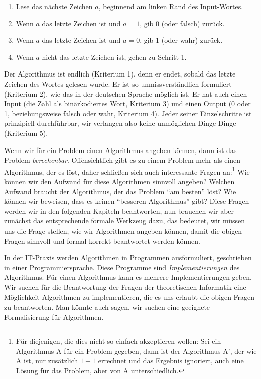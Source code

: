 \begin{enumerate}
    \item Lese das nächste Zeichen $a$, beginnend am linken Rand des Input-Wortes.
    \item Wenn $a$ das letzte Zeichen ist und $a = 1$, gib 0 (oder falsch) zurück.
    \item Wenn $a$ das letzte Zeichen ist und $a = 0$, gib 1 (oder wahr) zurück.
    \item Wenn $a$ nicht das letzte Zeichen ist, gehen zu Schritt 1.
\end{enumerate}

Der Algorithmus ist endlich (Kriterium 1),
denn er endet,
sobald das letzte Zeichen des Wortes gelesen wurde.
Er ist so unmissverständlich formuliert (Kriterium 2),
wie das in der deutschen Sprache möglich ist.
Er hat auch einen Input (die Zahl als binärkodiertes Wort, Kriterium 3)
und einen Output (0 oder 1, beziehungsweise falsch oder wahr, Kriterium 4).
Jeder seiner Einzelschritte ist prinzipiell durchführbar,
wir verlangen also keine unmöglichen Dinge Dinge (Kriterium 5).

Wenn wir für ein Problem einen Algorithmus angeben können,
dann ist das Problem \emph{berechenbar}.
Offensichtlich gibt es zu einem Problem mehr als einen Algorithmus,
der es löst, daher schließen sich auch interessante Fragen an:\footnote{Für diejenigen, die dies nicht so einfach akzeptieren wollen:
Sei ein Algorithmus A für ein Problem gegeben, dann ist der Algorithmus A', der wie A ist,
nur zusätzlich $1+1$ errechnet und das Ergebnis ignoriert,
auch eine Lösung für das Problem, aber von A unterschiedlich.}
Wie können wir den Aufwand für diese Algorithmen sinnvoll angeben?
Welchen Aufwand braucht der Algorithmus, der das Problem ``am besten'' löst?
Wie können wir beweisen, dass es keinen ``besseren Algorithmus'' gibt?
Diese Fragen werden wir in den folgenden Kapiteln beantworten,
nun brauchen wir aber zunächst das entsprechende formale Werkzeug dazu,
das bedeutet, wir müssen uns die Frage stellen, wie wir Algorithmen angeben können,
damit die obigen Fragen sinnvoll und formal korrekt beantwortet werden können.

In der IT-Praxis werden Algorithmen in Programmen ausformuliert,
geschrieben in einer Programmiersprache.
Diese Programme sind \emph{Implementierungen} des Algorithmus.
Für einen Algorithmus kann es mehrere Implementierungen geben. 
Wir suchen für die Beantwortung der Fragen der theoretischen Informatik
eine Möglichkeit Algorithmen zu implementieren,
die es uns erlaubt die obigen Fragen zu beantworten.
Man könnte auch sagen, wir suchen eine geeignete Formalisierung für Algorithmen.

